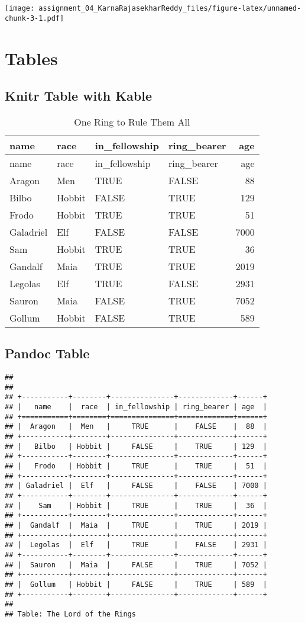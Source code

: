 \documentclass[
]{article}
\begin{document}
\texttt{[image: assignment\_04\_KarnaRajasekharReddy\_files/figure-latex/unnamed-chunk-3-1.pdf]}

\hypertarget{tables}{%
\section{Tables}\label{tables}}

\hypertarget{knitr-table-with-kable}{%
\subsection{Knitr Table with Kable}\label{knitr-table-with-kable}}

\begin{longtable}[]{@{}llllr@{}}
\caption{One Ring to Rule Them All}\tabularnewline
\toprule
name & race & in\_fellowship & ring\_bearer & age\tabularnewline
\midrule
\endfirsthead
\toprule
name & race & in\_fellowship & ring\_bearer & age\tabularnewline
\midrule
\endhead
Aragon & Men & TRUE & FALSE & 88\tabularnewline
Bilbo & Hobbit & FALSE & TRUE & 129\tabularnewline
Frodo & Hobbit & TRUE & TRUE & 51\tabularnewline
Galadriel & Elf & FALSE & FALSE & 7000\tabularnewline
Sam & Hobbit & TRUE & TRUE & 36\tabularnewline
Gandalf & Maia & TRUE & TRUE & 2019\tabularnewline
Legolas & Elf & TRUE & FALSE & 2931\tabularnewline
Sauron & Maia & FALSE & TRUE & 7052\tabularnewline
Gollum & Hobbit & FALSE & TRUE & 589\tabularnewline
\bottomrule
\end{longtable}

\hypertarget{pandoc-table}{%
\subsection{Pandoc Table}\label{pandoc-table}}

\begin{verbatim}
## 
## 
## +-----------+--------+---------------+-------------+------+
## |   name    |  race  | in_fellowship | ring_bearer | age  |
## +===========+========+===============+=============+======+
## |  Aragon   |  Men   |     TRUE      |    FALSE    |  88  |
## +-----------+--------+---------------+-------------+------+
## |   Bilbo   | Hobbit |     FALSE     |    TRUE     | 129  |
## +-----------+--------+---------------+-------------+------+
## |   Frodo   | Hobbit |     TRUE      |    TRUE     |  51  |
## +-----------+--------+---------------+-------------+------+
## | Galadriel |  Elf   |     FALSE     |    FALSE    | 7000 |
## +-----------+--------+---------------+-------------+------+
## |    Sam    | Hobbit |     TRUE      |    TRUE     |  36  |
## +-----------+--------+---------------+-------------+------+
## |  Gandalf  |  Maia  |     TRUE      |    TRUE     | 2019 |
## +-----------+--------+---------------+-------------+------+
## |  Legolas  |  Elf   |     TRUE      |    FALSE    | 2931 |
## +-----------+--------+---------------+-------------+------+
## |  Sauron   |  Maia  |     FALSE     |    TRUE     | 7052 |
## +-----------+--------+---------------+-------------+------+
## |  Gollum   | Hobbit |     FALSE     |    TRUE     | 589  |
## +-----------+--------+---------------+-------------+------+
## 
## Table: The Lord of the Rings
\end{verbatim}
\end{document}
